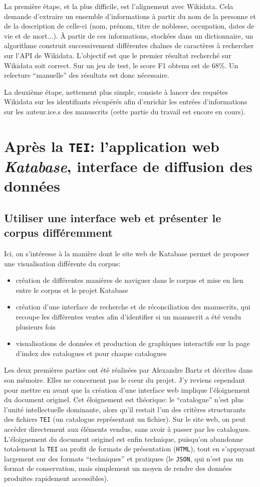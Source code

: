 \documentclass[a4paper, 12pt, twoside]{book}
\newcommand{\html}{\texttt{HTML}}
\newcommand{\json}{\texttt{JSON}}
\newcommand{\tei}{\texttt{TEI}}
\begin{document}
La première étape, et la plus difficile, est l'alignement avec Wikidata. Cela demande d'extraire un ensemble d'informations à partir du nom de la personne et de la description de celle-ci (nom, prénom, titre de noblesse, occupation, dates de vie et de mort...). À partir de ces informations, stockées dans un dictionnaire, un algorithme construit successivement différentes chaînes de caractères à rechercher sur l'API de Wikidata. L'objectif est que le premier résultat recherché sur Wikidata soit correct. Sur un jeu de test, le score F1 obtenu est de 68\%. Un relecture \enquote{manuelle} des résultats est donc nécessaire.

La deuxième étape, nettement plus simple, consiste à lancer des requêtes Wikidata sur les identifiants récupérés afin d'enrichir les entrées d'informations sur les auteur.ice.s des manuscrits (cette partie du travail est encore en cours).

\part{Après la \tei{}: l'application web \textit{Katabase}, interface de diffusion des données}
\chapter{Utiliser une interface web et présenter le corpus différemment}
Ici, on s'intéresse à la manière dont le site web de Katabase permet de proposer une visualisation différente du corpus:
\begin{itemize}
 \item création de différentes manières de naviguer dans le corpus et mise en lien entre le corpus et le projet Katabase
 \item création d'une interface de recherche et de réconciliation des manuscrits, qui recoupe les différentes ventes afin d'identifier si un manuscrit a été vendu plusieurs fois
 \item visualisations de données et production de graphiques interactifs sur la page d'index des catalogues et pour chaque catalogues
\end{itemize}

Les deux premières parties ont été réalisées par Alexandre Bartz et décrites dans son mémoire. Elles ne concernent pas le cœur du projet. J'y reviens cependant pour mettre en avant que la création d'une interface web implique l'éloignement du document originel. Cet éloignement est théorique: le \enquote{catalogue} n'est plus l'unité intellectuelle dominante, alors qu'il restait l'un des critères structurants des fichiers \tei{} (un catalogue représentant un fichier). Sur le site web, on peut accéder directement aux éléments vendus, sans avoir à passer par les catalogues. L'éloignement du document originel est enfin technique, puisqu'on abandonne totalement la \tei{} au profit de formats de présentation (\html{}), tout en s'appuyant largement sur des formats \enquote{techniques} et pratiques (le \json, qui n'est pas un format de conservation, mais simplement un moyen de rendre des données produites rapidement accessibles).
\end{document}
